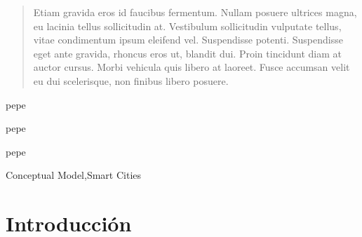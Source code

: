 \documentclass[a4paper,fleqn,spanish]{cas-dc}
\begin{document}
% 
% 
% 
% 
% 
% 



\nonumnote{}


\begin{abstract}
Etiam gravida eros id faucibus fermentum. Nullam posuere ultrices magna, eu
lacinia tellus sollicitudin at. Vestibulum sollicitudin vulputate tellus, vitae
condimentum ipsum eleifend vel. Suspendisse potenti. Suspendisse eget ante
gravida, rhoncus eros ut, blandit dui. Proin tincidunt diam at auctor cursus.
Morbi vehicula quis libero at laoreet. Fusce accumsan velit eu dui scelerisque,
non finibus libero posuere.
\end{abstract}



\begin{highlights}
\item pepe
\item pepe
\item pepe
\end{highlights}


\begin{keywords}
Conceptual Model\sep Smart Cities
\end{keywords}

\maketitle


\section{Introducción}\label{intro}
\lipsum[12]
\end{document}
